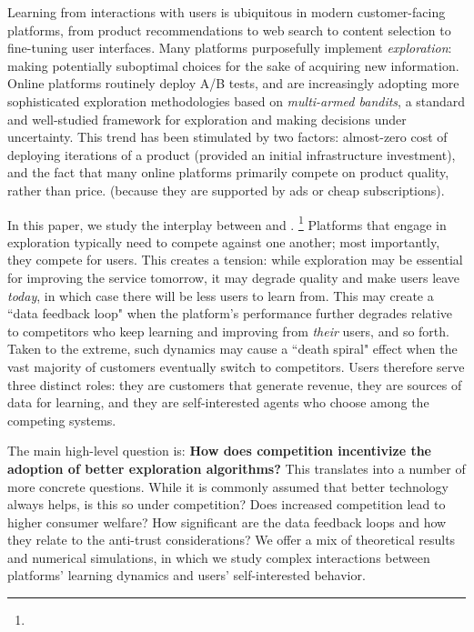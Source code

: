 
Learning from interactions with users is ubiquitous in modern customer-facing platforms, from product recommendations to web search to content selection to fine-tuning user interfaces. Many platforms purposefully implement \emph{exploration}: making potentially suboptimal choices for the sake of acquiring new information. Online platforms routinely deploy A/B tests, and are increasingly adopting  more sophisticated exploration methodologies based on \emph{multi-armed bandits}, a standard and well-studied framework for exploration and making decisions under uncertainty. This trend has been stimulated by two factors: almost-zero cost of deploying iterations of a product (provided an initial infrastructure investment), and the fact that many online platforms primarily compete on product quality, rather than price.
(\eg because they are supported by ads or cheap subscriptions).


In this paper, we study the interplay between \exploration and \competition.%
\footnote{}
Platforms that engage in exploration typically need to compete against one another; most importantly, they compete for users. This creates a tension:
while exploration may be essential for improving the service tomorrow, it may degrade quality and make users leave \emph{today}, in which case there will be less users to learn from. This may create a ``data feedback loop" when the platform's performance further degrades relative to competitors who keep learning and improving from \emph{their} users, and so forth. Taken to the extreme, such dynamics may cause a ``death spiral" effect when the vast majority of customers eventually switch to competitors. Users therefore serve three distinct roles: they are customers that generate revenue, they are sources of data for learning, and they are self-interested agents who choose among the competing systems.

The main high-level question is:
\textbf{How does competition incentivize the adoption of better exploration algorithms?}
This translates into a number of more concrete questions. While it is commonly assumed that better technology always helps, is this so under competition? Does increased competition lead to higher consumer welfare? How significant are the data feedback loops
and how they relate to the anti-trust considerations?
We offer a mix of theoretical results and numerical simulations, in which we study complex interactions between platforms' learning dynamics and users' self-interested behavior.

